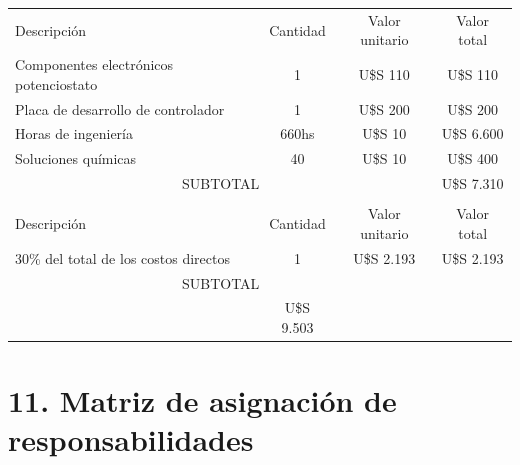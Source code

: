\documentclass[11pt]{charter}
\begin{document}
\begin{table}[htpb]
\centering
\begin{tabularx}{\linewidth}{@{}|X|c|r|r|@{}}
\hline
\rowcolor[HTML]{C0C0C0} 
\multicolumn{4}{|c|}{\cellcolor[HTML]{C0C0C0}COSTOS DIRECTOS} \\ \hline
\rowcolor[HTML]{C0C0C0} 
Descripción &
  \multicolumn{1}{c|}{\cellcolor[HTML]{C0C0C0}Cantidad} &
  \multicolumn{1}{c|}{\cellcolor[HTML]{C0C0C0}Valor unitario} &
  \multicolumn{1}{c|}{\cellcolor[HTML]{C0C0C0}Valor total} \\ \hline
Componentes electrónicos potenciostato & 
  \multicolumn{1}{c|}{1} & 
  \multicolumn{1}{c|}{U\$S 110} &
  \multicolumn{1}{c|}{U\$S 110} \\ \hline
Placa de desarrollo de controlador &
  \multicolumn{1}{c|}{1} &
  \multicolumn{1}{c|}{U\$S 200} &
  \multicolumn{1}{c|}{U\$S 200} \\ \hline
Horas de ingeniería &
  \multicolumn{1}{c|}{660hs} &
  \multicolumn{1}{c|}{U\$S 10} &
  \multicolumn{1}{c|}{U\$S 6.600} \\ \hline
Soluciones químicas &  
  \multicolumn{1}{c|}{40} &
  \multicolumn{1}{c|}{U\$S 10} &
  \multicolumn{1}{c|}{U\$S 400} \\ \hline 
\multicolumn{3}{|c|}{SUBTOTAL} &
  \multicolumn{1}{c|}{U\$S 7.310} \\ \hline
\rowcolor[HTML]{C0C0C0} 
\hline
\multicolumn{4}{|c|}{\cellcolor[HTML]{C0C0C0}COSTOS INDIRECTOS} \\ \hline
\rowcolor[HTML]{C0C0C0} 
Descripción &
  \multicolumn{1}{c|}{\cellcolor[HTML]{C0C0C0}Cantidad} &
  \multicolumn{1}{c|}{\cellcolor[HTML]{C0C0C0}Valor unitario} &
  \multicolumn{1}{c|}{\cellcolor[HTML]{C0C0C0}Valor total} \\ \hline
30\% del total de los costos directos &
  \multicolumn{1}{c|}{1} &
  \multicolumn{1}{c|}{U\$S 2.193} &
  \multicolumn{1}{c|}{U\$S 2.193} \\ \hline 
\multicolumn{3}{|c|}{SUBTOTAL} &
  \multicolumn{1}{c|}{} \\ \hline
\rowcolor[HTML]{C0C0C0}
\multicolumn{3}{|c|}{TOTAL} &
 U\$S 9.503  \\ \hline
\end{tabularx}%
\end{table}


\section{11. Matriz de asignación de responsabilidades}
\label{sec:responsabilidades}
\end{document}
